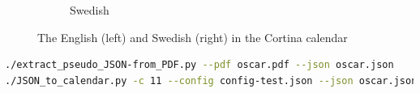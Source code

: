 \begin{figure}[!ht]
\begin{center}
\begin{subfigure}{0.45\textwidth}
    \caption{Swedish}
  \end{subfigure}
  \end{center}
  \caption{The English (left) and Swedish (right) in the Cortina calendar}
  \label{fig:actualEnglishAndSwedish}
\end{figure}
\newpage

\begin{lstlisting}[language={bash}, caption={Commands to extract the JSON and to make the calendar entries and announcements}, label=lst:extractPseudoAndJSONtoCalendar]
./extract_pseudo_JSON-from_PDF.py --pdf oscar.pdf --json oscar.json
./JSON_to_calendar.py -c 11 --config config-test.json --json oscar.json
\end{lstlisting}

